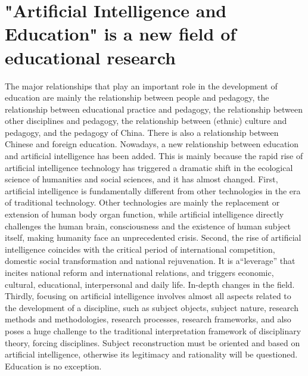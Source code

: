\documentclass[lang=en,11pt,a4paper,towcolumn]{elegantpaper}
\begin{document}
\section{"Artificial Intelligence and Education" is a new field of educational research}
The major relationships that play an important role in the development of education are mainly the relationship between people and pedagogy, the relationship between educational practice and pedagogy, the relationship between other disciplines and pedagogy, the relationship between (ethnic) culture and pedagogy, and the pedagogy of China. There is also a relationship between Chinese and foreign education. Nowadays, a new relationship between education and artificial intelligence has been added. This is mainly because the rapid rise of artificial intelligence technology has triggered a dramatic shift in the ecological science of humanities and social sciences, and it has almost changed. First, artificial intelligence is fundamentally different from other technologies in the era of traditional technology. Other technologies are mainly the replacement or extension of human body organ function, while artificial intelligence directly challenges the human brain, consciousness and the existence of human subject itself, making humanity face an unprecedented crisis. Second, the rise of artificial intelligence coincides with the critical period of international competition, domestic social transformation and national rejuvenation. It is a“leverage” that incites national reform and international relations, and triggers economic, cultural, educational, interpersonal and daily life. In-depth changes in the field. Thirdly, focusing on artificial intelligence involves almost all aspects related to the development of a discipline, such as subject objects, subject nature, research methods and methodologies, research processes, research frameworks, and also poses a huge challenge to the traditional interpretation framework of disciplinary theory, forcing disciplines. Subject reconstruction must be oriented and based on artificial intelligence, otherwise its legitimacy and rationality will be questioned. Education is no exception.
\end{document}
